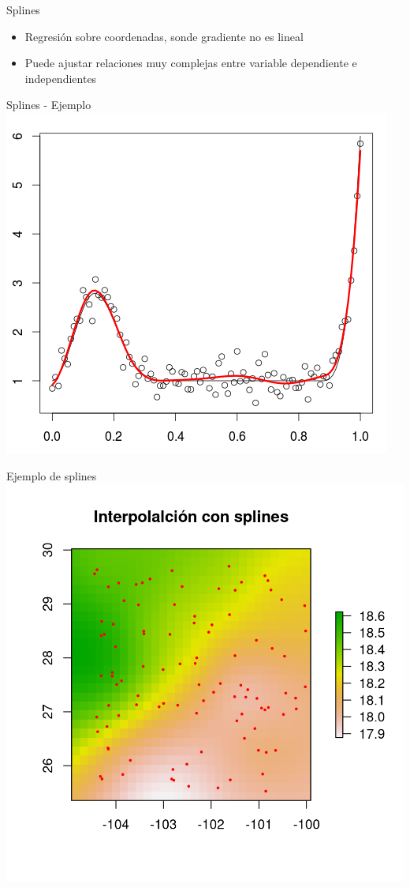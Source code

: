 \documentclass[
  11pt,
  ignorenonframetext,
]{beamer}
\begin{document}
\begin{frame}{Splines}
\protect\hypertarget{splines}{}
\begin{itemize}
\item
  Regresión sobre coordenadas, sonde gradiente no es lineal
\item
  Puede ajustar relaciones muy complejas entre variable dependiente e
  independientes
\end{itemize}
\end{frame}

\begin{frame}{Splines - Ejemplo}
\protect\hypertarget{splines---ejemplo}{}
\includegraphics{Interpolacion/Splines.png}
\end{frame}

\begin{frame}{Ejemplo de splines}
\protect\hypertarget{ejemplo-de-splines}{}
\includegraphics{Interpolacion/Splines-ejemplo.png}
\end{frame}
\end{document}
